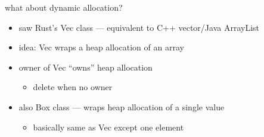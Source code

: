 \begin{frame}{what about dynamic allocation?}
    \begin{itemize}
    \item saw Rust's Vec class --- equivalent to C++ vector/Java ArrayList
    \item idea: Vec wraps a heap allocation of an array
    \item owner of Vec ``owns'' heap allocation
        \begin{itemize}
        \item delete when no owner
        \end{itemize}
    \item also Box class --- wraps heap allocation of a single value
        \begin{itemize}
        \item basically same as Vec except one element
        \end{itemize}
    \end{itemize}
\end{frame}

